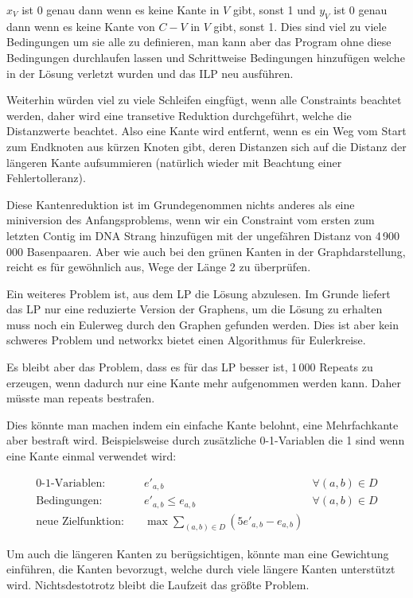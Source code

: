 $x_V$ ist 0 genau dann wenn es keine Kante in $V$ gibt, sonst 1 und $y_V$ ist 0 genau dann wenn es keine Kante von $C-V$ in $V$ gibt, sonst 1.
Dies sind viel zu viele Bedingungen um sie alle zu definieren, man kann aber das Program ohne diese Bedingungen durchlaufen lassen und Schrittweise Bedingungen hinzufügen welche in der Lösung verletzt wurden und das ILP neu ausführen.

Weiterhin würden viel zu viele Schleifen eingfügt, wenn alle Constraints beachtet werden, daher wird eine transetive Reduktion durchgeführt, welche die Distanzwerte beachtet. Also eine Kante wird entfernt, wenn es ein Weg vom Start zum Endknoten aus kürzen Knoten gibt, deren Distanzen sich auf die Distanz der längeren Kante aufsummieren (natürlich wieder mit Beachtung einer Fehlertolleranz).

Diese Kantenreduktion ist im Grundegenommen nichts anderes als eine miniversion des Anfangsproblems, wenn wir ein Constraint vom ersten zum letzten Contig im DNA Strang hinzufügen mit der ungefähren Distanz von 4\,900\,000 Basenpaaren. Aber wie auch bei den grünen Kanten in der Graphdarstellung, reicht es für gewöhnlich aus, Wege der Länge 2 zu überprüfen.

Ein weiteres Problem ist, aus dem LP die Lösung abzulesen. Im Grunde liefert das LP nur eine reduzierte Version der Graphens, um die Lösung zu erhalten muss noch ein Eulerweg durch den Graphen gefunden werden. Dies ist aber kein schweres Problem und networkx bietet einen Algorithmus für Eulerkreise.

Es bleibt aber das Problem, dass es für das LP besser ist, 1\,000 Repeats zu erzeugen, wenn dadurch nur eine Kante mehr aufgenommen werden kann. Daher müsste man repeats bestrafen. 

Dies könnte man machen indem ein einfache Kante belohnt, eine Mehrfachkante aber bestraft wird. Beispielsweise durch zusätzliche 0-1-Variablen die 1 sind wenn eine Kante einmal verwendet wird:

\begin{align*}
\text{0-1-Variablen:}\quad& e'_{a,b} &\forall (a,b) \in D\\
\text{Bedingungen:}\quad& e'_{a,b} \leq e_{a,b}&\forall (a,b) \in D\\
\text{neue Zielfunktion:}\quad& \max \sum_{(a,b) \in D} (5 e'_{a,b} - e_{a,b})
\end{align*}

Um auch die längeren Kanten zu berügsichtigen, könnte man eine Gewichtung einführen, die Kanten bevorzugt, welche durch viele längere Kanten unterstützt wird. Nichtsdestotrotz bleibt die Laufzeit das größte Problem.
\clearpage
%

\printbibliography
\printbibliography[heading=bibintoc, title=References]
\clearpage
\listoffigures
\listoftables
